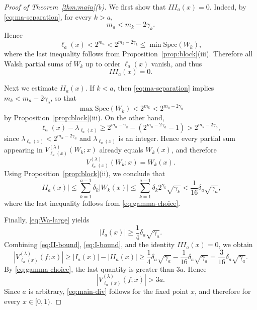 \documentclass[11pt]{amsart}
\numberwithin{equation}{section}
\theoremstyle{plain}
\begin{document}
\begin{proof}[Proof of Theorem~\protect\ref{thm:main}(b)]
We first show that $III_a(x)=0$. Indeed, by \eqref{eq:ma-separation}, for
every $k>a$, 
\begin{equation*}
m_a<m_k-2\gamma_k.
\end{equation*}
Hence 
\begin{equation*}
\ell_a(x)<2^{m_a}<2^{m_k-2\gamma_k}\le \min \mathrm{Spec}(W_k),
\end{equation*}
where the last inequality follows from Proposition~\ref{prop:block}(iii).
Therefore all Walsh partial sums of $W_k$ up to order $\ell_a(x)$ vanish,
and thus 
\begin{equation*}
III_a(x)=0.
\end{equation*}

Next we estimate $II_{a}(x)$. If $k<a$, then \eqref{eq:ma-separation}
implies $m_{k}<m_{a}-2\gamma _{a}$, so that 
\begin{equation*}
\max \mathrm{Spec}(W_{k})<2^{m_{k}}<2^{m_{a}-2\gamma _{a}}
\end{equation*}%
by Proposition~\ref{prop:block}(iii). On the other hand, 
\begin{equation*}
\ell _{a}(x)-\lambda _{\ell _{a}(x)}\geq 2^{m_{a}-\gamma _{a}}-\left(
2^{m_{a}-2\gamma _{a}}-1\right) >2^{m_{a}-2\gamma _{a}},
\end{equation*}%
since $\lambda _{\ell _{a}(x)}<2^{m_{a}-2\gamma _{a}}$ and $\lambda _{\ell
_{a}(x)}$ is an integer.  Hence every partial sum appearing in $V_{\ell
_{a}(x)}^{(\lambda )}(W_{k};x)$ already equals $W_{k}(x)$, and therefore 
\begin{equation*}
V_{\ell _{a}(x)}^{(\lambda )}(W_{k};x)=W_{k}(x).
\end{equation*}%
Using Proposition~\ref{prop:block}(ii), we conclude that 
\begin{equation}
|II_{a}(x)|\leq \sum_{k=1}^{a-1}\delta _{k}|W_{k}(x)|\leq
\sum_{k=1}^{a-1}\delta _{k}2^{\gamma _{k}}\sqrt{\gamma _{k}}<\frac{1}{16}%
\delta _{a}\sqrt{\gamma _{a}},  \label{eq:II-bound}
\end{equation}%
where the last inequality follows from \eqref{eq:gamma-choice}.

Finally, \eqref{eq:Wa-large} yields 
\begin{equation}  \label{eq:I-bound}
|I_a(x)|\ge \frac14\delta_a\sqrt{\gamma_a}.
\end{equation}
Combining \eqref{eq:II-bound}, \eqref{eq:I-bound}, and the identity $%
III_a(x)=0$, we obtain 
\begin{equation*}
|V_{\ell_a(x)}^{(\lambda)}(f;x)|\ge |I_a(x)|-|II_a(x)|\ge \frac14\delta_a%
\sqrt{\gamma_a}-\frac{1}{16}\delta_a\sqrt{\gamma_a}=\frac{3}{16}\delta_a%
\sqrt{\gamma_a}.
\end{equation*}
By \eqref{eq:gamma-choice}, the last quantity is greater than $3a$. Hence 
\begin{equation*}
|V_{\ell_a(x)}^{(\lambda)}(f;x)|>3a.
\end{equation*}
Since $a$ is arbitrary, \eqref{eq:main-div} follows for the fixed point $x$,
and therefore for every $x\in[0,1)$.
\end{proof}
\end{document}

